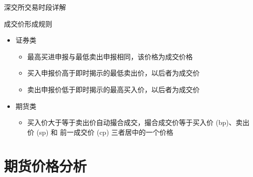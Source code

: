 \begin{frame}{深交所交易时段详解}
     \begin{table}
      \centering
    \end{table}
\end{frame}

\begin{frame}{成交价形成规则}
  \begin{itemize}
  \item 证券类
    \begin{itemize}[<+-|alert@+>]
    \item 最高买进申报与最低卖出申报相同，该价格为成交价格
    \item 买入申报价高于即时揭示的最低卖出价，以后者为成交价
    \item 卖出申报价低于即时揭示的最高买入价，以后者为成交价
    \end{itemize}
    \item 期货类
      \begin{itemize}[<+-|alert@+>]
      \item 买入价大于等于卖出价自动撮合成交，撮合成交价等于买入价 (bp)、卖出价
        (sp) 和 前一成交价 (cp) 三者居中的一个价格
      \end{itemize}
  \end{itemize}
\end{frame}

\section{期货价格分析}

